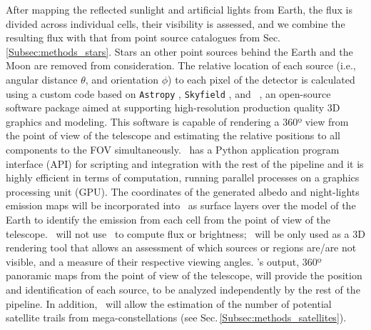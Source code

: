\documentclass[usenames,dvipsnames,modern]{CLASS_FILES/aastex631}  %
\begin{document}
After mapping the reflected sunlight and artificial lights from Earth, the flux is divided across individual cells, their visibility is assessed, and we combine the resulting flux with that from  point source catalogues from Sec.\,\ref{Subsec:methods_stars}. Stars an other point sources behind the Earth and the Moon are removed from consideration. The relative location of each source (i.e., angular distance $\theta$, and orientation $\phi$) to each pixel of the detector is calculated using a custom code based on \texttt{Astropy} \citep[][estimation the footprint the detector]{collaboration+2013aap558_33, collaboration+2018aj156_123}, \texttt{Skyfield} \citep[][estimation of the orbits, attitude of the spacecraft]{rhodes2019misc}, and \Blender\ \citep{blender_manual}, an open-source software package aimed at supporting high-resolution production quality 3D graphics and modeling. This software is capable of rendering a 360º view from the point of view of the telescope and estimating the relative positions to all components to the FOV simultaneously. \Blender\ has a Python application program interface (API) for scripting and integration with the rest of the pipeline and it is highly efficient in terms of computation, running parallel processes on a graphics processing unit (GPU). The coordinates of the generated albedo and night-lights emission maps will be incorporated into \Blender\ as surface layers over the model of the Earth to identify the emission from each cell from the point of view of the telescope. \MyName\ will not use \Blender\ to compute flux or brightness; \Blender\ will be only used as a 3D rendering tool that allows an assessment of which sources or regions are/are not visible, and a measure of their respective viewing angles. \Blender's output, 360º panoramic maps from the point of view of the telescope, will provide the position and identification of each source, to be analyzed independently by the rest of the pipeline. In addition, \Blender\ will allow the estimation of the number of potential satellite trails from mega-constellations (see Sec.\,\ref{Subsec:methods_satellites}).\\ 

\end{document}
